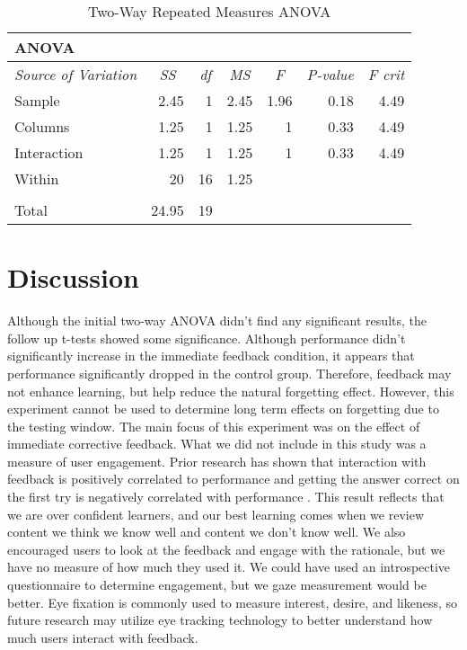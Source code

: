 \documentclass[acmtog]{acmart}
\begin{document}
\begin{table}[htbp]
  \centering
  \caption{Two-Way Repeated Measures ANOVA}
    \begin{tabular}{lrrrrrr}
    ANOVA &       &       &       &       &       &  \\
    \midrule
    \multicolumn{1}{c}{\textit{Source of Variation}} & \multicolumn{1}{c}{\textit{SS}} & \multicolumn{1}{c}{\textit{df}} & \multicolumn{1}{c}{\textit{MS}} & \multicolumn{1}{c}{\textit{F}} & \multicolumn{1}{c}{\textit{P-value}} & \multicolumn{1}{c}{\textit{F crit}} \\
    \midrule
    Sample & 2.45  & 1     & 2.45  & 1.96  & 0.18 & 4.49 \\
    Columns & 1.25  & 1     & 1.25  & 1     & 0.33 & 4.49 \\
    Interaction & 1.25  & 1     & 1.25  & 1     & 0.33 & 4.49 \\
    Within & 20    & 16    & 1.25  &       &       &  \\
          &       &       &       &       &       &  \\
    Total & 24.95 & 19    &       &       &       &  \\
    \bottomrule
    \end{tabular}%
  \label{tab:addlabel}%
\end{table}%

\section{Discussion}
Although the initial two-way ANOVA didn't find any significant results, the follow up t-tests showed some significance. Although performance didn't significantly increase in the immediate feedback condition, it appears that performance significantly dropped in the control group. Therefore, feedback may not enhance learning, but help reduce the natural forgetting effect. However, this experiment cannot be used to determine long term effects on forgetting due to the testing window. The main focus of this experiment was on the effect of immediate corrective feedback. What we did not include in this study was a measure of user engagement. Prior research has shown that interaction with feedback is positively correlated to performance and getting the answer correct on the first try is negatively correlated with performance \cite{chen2018analyzing}. This result reflects that we are over confident learners, and our best learning comes when we review content we think we know well and content we don't know well. We also encouraged users to look at the feedback and engage with the rationale, but we have no measure of how much they used it. We could have used an introspective questionnaire to determine engagement, but we gaze measurement would be better. Eye fixation is commonly used to measure interest, desire, and likeness, so future research may utilize eye tracking technology to better understand how much users interact with feedback.
\end{document}

